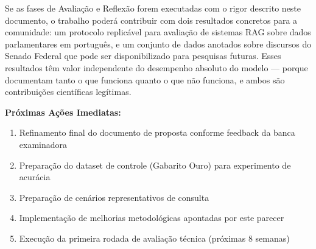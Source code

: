 Se as fases de Avaliação e Reflexão forem executadas com o rigor descrito neste documento, o trabalho poderá contribuir com dois resultados concretos para a comunidade: um protocolo replicável para avaliação de sistemas RAG sobre dados parlamentares em português, e um conjunto de dados anotados sobre discursos do Senado Federal que pode ser disponibilizado para pesquisas futuras. Esses resultados têm valor independente do desempenho absoluto do modelo — porque documentam tanto o que funciona quanto o que não funciona, e ambos são contribuições científicas legítimas.

\textbf{Próximas Ações Imediatas:}

\begin{enumerate}
    \item Refinamento final do documento de proposta conforme feedback da banca examinadora
    \item Preparação do dataset de controle (Gabarito Ouro) para experimento de acurácia
    \item Preparação de cenários representativos de consulta
    \item Implementação de melhorias metodológicas apontadas por este parecer
    \item Execução da primeira rodada de avaliação técnica (próximas 8 semanas)
\end{enumerate}
